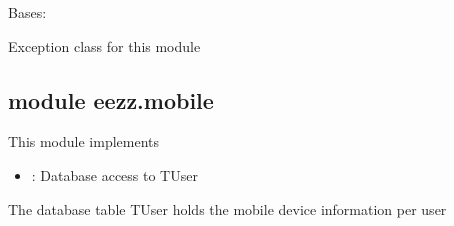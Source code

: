 \documentclass[letterpaper,10pt,english]{sphinxmanual}
\begin{document}
\begin{savenotes}
\begin{fulllineitems}
\begin{savenotes}
\begin{fulllineitems}
\begin{quote}
\begin{description}
\begin{itemize}
\end{itemize}

\end{description}\end{quote}

\end{fulllineitems}\end{savenotes}


\end{fulllineitems}\end{savenotes}


\begin{savenotes}\begin{fulllineitems}
\label{\detokenize{eezz:eezz.websocket.TWebSocketException}}
\pysigstartsignatures
{}
\pysigstopsignatures
\sphinxAtStartPar
Bases: 

\sphinxAtStartPar
Exception class for this module

\end{fulllineitems}\end{savenotes}



\subsection{module eezz.mobile}
\label{\detokenize{eezz:module-eezz.mobile}}\label{\detokenize{eezz:module-eezz-mobile}}
\sphinxAtStartPar
This module implements
\begin{itemize}
\item {} 
\sphinxAtStartPar
{\hyperref[\detokenize{eezz:eezz.mobile.TMobileDevices}]{}}: Database access to TUser

\end{itemize}

\sphinxAtStartPar
The database table TUser holds the mobile device information per user
\end{document}
